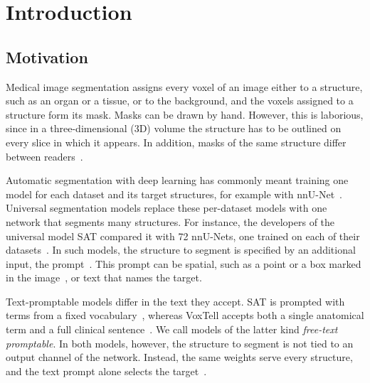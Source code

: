 %

\chapter{Introduction}
\label{chap:intro}

\section{Motivation}
\label{sec:intro-motivation}

Medical image segmentation assigns every voxel of an image either to a structure, such as an organ or a tissue, or to the background, and the voxels assigned to a structure form its mask.
Masks can be drawn by hand.
However, this is laborious, since in a three-dimensional (3D) volume the structure has to be outlined on every slice in which it appears.
In addition, masks of the same structure differ between readers~\cite{desai2021skmtea}.

Automatic segmentation with deep learning has commonly meant training one model for each dataset and its target structures, for example with nnU-Net~\cite{isensee2018nnunetselfadaptingframeworkunetbased}.
Universal segmentation models replace these per-dataset models with one network that segments many structures.
For instance, the developers of the universal model SAT compared it with 72 nnU-Nets, one trained on each of their datasets~\cite{zhao2025sat}.
In such models, the structure to segment is specified by an additional input, the prompt~\cite{zhao2025sat,rokuss2025voxtellfreetextpromptableuniversal}.
This prompt can be spatial, such as a point or a box marked in the image~\cite{Ma_2024,cheng2023sammed2d}, or text that names the target.

Text-promptable models differ in the text they accept.
SAT is prompted with terms from a fixed vocabulary~\cite{zhao2025sat}, whereas VoxTell accepts both a single anatomical term and a full clinical sentence~\cite{rokuss2025voxtellfreetextpromptableuniversal}.
We call models of the latter kind \emph{free-text promptable}.
In both models, however, the structure to segment is not tied to an output channel of the network.
Instead, the same weights serve every structure, and the text prompt alone selects the target~\cite{zhao2025sat,rokuss2025voxtellfreetextpromptableuniversal}.

